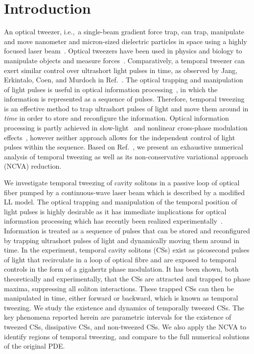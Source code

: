 \documentclass[aps,floatfix,showpacs,preprintnumbers,twocolumn,nofootinbib]{revtex4}
\begin{document}
\section{Introduction}
An optical tweezer, i.e.,~a single-beam gradient force trap, can trap, manipulate and move nanometer and micron-sized dielectric particles in space using a highly focused laser beam~\cite{Ashkin1970,Ashkin1986}.  Optical tweezers have been used in physics and biology to manipulate objects and measure forces~\cite{ChuOpt}.  Comparatively, a temporal tweezer can exert similar control over ultrashort light pulses in time, as observed by Jang, Erkintalo, Coen, and Murdoch in Ref.~\cite{tweeze}.  The optical trapping and manipulation of light pulses is useful in optical information processing~\cite{info1, info2, info3, info4}, in which the information is represented as a sequence of pulses.  Therefore, temporal tweezing is an effective method to trap ultrashort pulses of light and move them around in {\em time} in order to store and reconfigure the information.  Optical information processing is partly achieved in slow-light~\cite{info5, info6, info7, info8} and nonlinear cross-phase modulation effects~\cite{info9, info10, info11, info12, info13, info14}, however neither approach allows for the independent control of light pulses within the sequence.  
Based on Ref.~\cite{tweeze}, we present an exhaustive numerical analysis of temporal tweezing as well as its non-conservative variational approach (NCVA) reduction.  
%

We investigate temporal tweezing of cavity solitons in a passive loop of optical fiber pumped by a continuous-wave laser beam which is described by a modified LL model.  The optical trapping and manipulation of the temporal position of light pulses is highly desirable as it has immediate implications for optical information processing which has recently been realized experimentally~\cite{tweeze}.  Information is treated as a sequence of pulses that can be stored and reconfigured by trapping ultrashort pulses of light and dynamically moving them around in time.  In the experiment, temporal cavity solitons (CSs) exist as picosecond pulses of light that recirculate in a loop of optical fibre and are exposed to temporal controls in the form of a gigahertz phase modulation.  It has been shown, both theoretically and experimentally, that the CSs are attracted and trapped to phase maxima, suppressing all soliton interactions.  These trapped CSs can then be manipulated in time, either forward or backward, which is known as temporal tweezing.  We study the existence and dynamics of temporally tweezed CSs.  The key phenomena reported herein are parametric intervals for the existence of tweezed CSs, dissipative CSs, and non-tweezed CSs.  We also apply the NCVA to identify regions of temporal tweezing, and compare to the full numerical solutions of the original PDE.    
%
\end{document}
